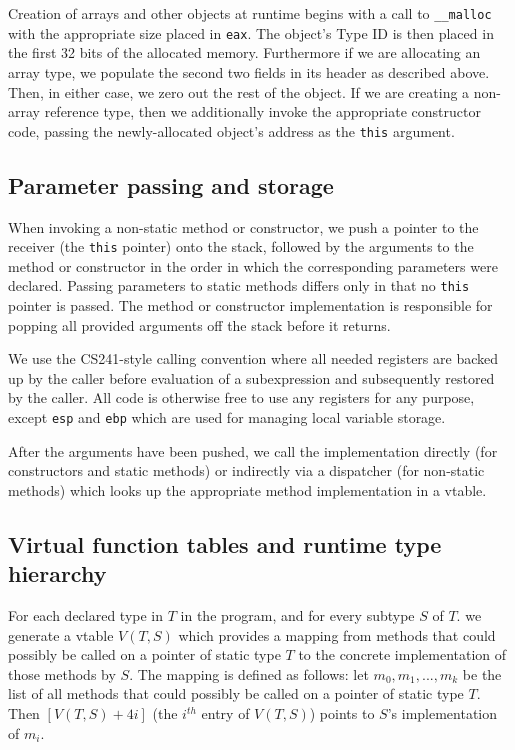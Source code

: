 \documentclass[12pt]{article}
\newcommand{\code}[1]{\texttt{#1}}
\begin{document}
Creation of arrays and other objects at runtime begins with a call to \code{\_\_malloc} with the appropriate size placed in \code{eax}. The object's Type ID is then placed in the first 32 bits of the allocated memory. Furthermore if we are allocating an array type, we populate the second two fields in its header as described above. Then, in either case, we zero out the rest of the object. If we are creating a non-array reference type, then we additionally invoke the appropriate constructor code, passing the newly-allocated object's address as the \code{this} argument. 

\subsection{Parameter passing and storage}

When invoking a non-static method or constructor, we push a pointer to the receiver (the \code{this} pointer) onto the stack, followed by the arguments to the method or constructor in the order in which the corresponding parameters were declared. Passing parameters to static methods differs only in that no \code{this} pointer is passed. The method or constructor implementation is responsible for popping all provided arguments off the stack before it returns.

We use the CS241-style calling convention where all needed registers are backed up by the caller before evaluation of a subexpression and subsequently restored by the caller.  All code is otherwise free to use any registers for any purpose, except \code{esp} and \code{ebp} which are used for managing local variable storage.

After the arguments have been pushed, we call the implementation directly (for constructors and static methods) or indirectly via a dispatcher (for non-static methods) which looks up the appropriate method implementation in a vtable.

\subsection{Virtual function tables and runtime type hierarchy}

For each declared type in $T$ in the program, and for every subtype $S$ of $T$. we generate a vtable $V(T,S)$ which provides a mapping from methods that could possibly be called on a pointer of static type $T$ to the concrete implementation of those methods by $S$. The mapping is defined as follows: let ${m_0,m_1,...,m_k}$ be the list of all methods that could possibly be called on a pointer of static type $T$. Then $[V(T,S)+4i]$ (the $i^{th}$ entry of $V(T,S)$) points to $S$'s implementation of $m_i$.
\end{document}
